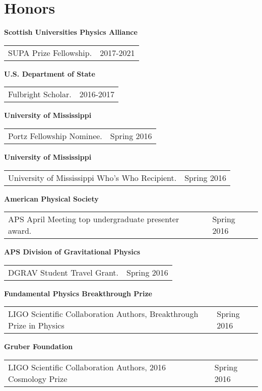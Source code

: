 \section{\sc Honors}
{\bf{Scottish Universities Physics Alliance}}\\
\begin{tabular}{@{}p{4in}p{2in}}
SUPA Prize Fellowship. & 2017-2021\\
\end{tabular}

{\bf{U.S. Department of State}}\\
\begin{tabular}{@{}p{4in}p{2in}}
Fulbright Scholar. & 2016-2017\\
\end{tabular}

{\bf{University of Mississippi}}\\
\begin{tabular}{@{}p{4in}p{2in}}
Portz Fellowship Nominee. & Spring 2016\\
\end{tabular}

{\bf{University of Mississippi}}\\
\begin{tabular}{@{}p{4in}p{2in}}
University of Mississippi Who's Who Recipient. & Spring 2016\\
\end{tabular}

{\bf{American Physical Society}}\\
\begin{tabular}{@{}p{4in}p{2in}}
APS April Meeting top undergraduate presenter award. & Spring 2016\\
\end{tabular}

{\bf{APS Division of Gravitational Physics}}\\
\begin{tabular}{@{}p{4in}p{2in}}
DGRAV Student Travel Grant. & Spring 2016\\
\end{tabular}

{\bf{Fundamental Physics Breakthrough Prize}}\\
\begin{tabular}{@{}p{4in}p{2in}}
LIGO Scientific Collaboration Authors, Breakthrough Prize in Physics & Spring 2016\\
\end{tabular}

{\bf{Gruber Foundation}}\\
\begin{tabular}{@{}p{4in}p{2in}}
LIGO Scientific Collaboration Authors, 2016 Cosmology Prize & Spring 2016\\
\end{tabular}


